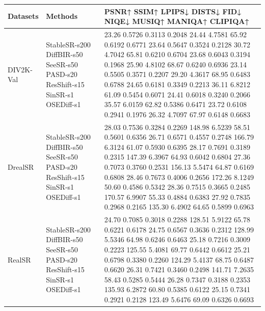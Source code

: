 \begin{tabular}{lll}
\toprule
Datasets & Methods & PSNR↑ SSIM↑ LPIPS↓ DISTS↓ FID↓ NIQE↓ MUSIQ↑ MANIQA↑ CLIPIQA↑ \\
\midrule
DIV2K-Val & StableSR-s200 DiffBIR-s50 SeeSR-s50 PASD-s20 ResShift-s15 SinSR-s1 OSEDiff-s1 & 23.26 0.5726 0.3113 0.2048 24.44 4.7581 65.92 0.6192 0.6771 23.64 0.5647 0.3524 0.2128 30.72 4.7042 65.81 0.6210 0.6704 23.68 0.6043 0.3194 0.1968 25.90 4.8102 68.67 0.6240 0.6936 23.14 0.5505 0.3571 0.2207 29.20 4.3617 68.95 0.6483 0.6788 24.65 0.6181 0.3349 0.2213 36.11 6.8212 61.09 0.5454 0.6071 24.41 0.6018 0.3240 0.2066 35.57 6.0159 62.82 0.5386 0.6471 23.72 0.6108 0.2941 0.1976 26.32 4.7097 67.97 0.6148 0.6683 \\
DrealSR & StableSR-s200 DiffBIR-s50 SeeSR-s50 PASD-s20 ResShift-s15 SinSR-s1 OSEDiff-s1 & 28.03 0.7536 0.3284 0.2269 148.98 6.5239 58.51 0.5601 0.6356 26.71 0.6571 0.4557 0.2748 166.79 6.3124 61.07 0.5930 0.6395 28.17 0.7691 0.3189 0.2315 147.39 6.3967 64.93 0.6042 0.6804 27.36 0.7073 0.3760 0.2531 156.13 5.5474 64.87 0.6169 0.6808 28.46 0.7673 0.4006 0.2656 172.26 8.1249 50.60 0.4586 0.5342 28.36 0.7515 0.3665 0.2485 170.57 6.9907 55.33 0.4884 0.6383 27.92 0.7835 0.2968 0.2165 135.30 6.4902 64.65 0.5899 0.6963 \\
RealSR & StableSR-s200 DiffBIR-s50 SeeSR-s50 PASD-s20 ResShift-s15 SinSR-s1 OSEDiff-s1 & 24.70 0.7085 0.3018 0.2288 128.51 5.9122 65.78 0.6221 0.6178 24.75 0.6567 0.3636 0.2312 128.99 5.5346 64.98 0.6246 0.6463 25.18 0.7216 0.3009 0.2223 125.55 5.4081 69.77 0.6442 0.6612 25.21 0.6798 0.3380 0.2260 124.29 5.4137 68.75 0.6487 0.6620 26.31 0.7421 0.3460 0.2498 141.71 7.2635 58.43 0.5285 0.5444 26.28 0.7347 0.3188 0.2353 135.93 6.2872 60.80 0.5385 0.6122 25.15 0.7341 0.2921 0.2128 123.49 5.6476 69.09 0.6326 0.6693 \\
\bottomrule
\end{tabular}
